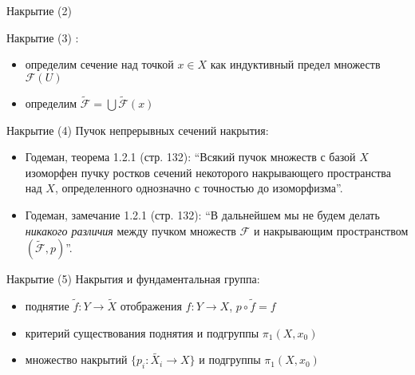 \documentclass{beamer}
\begin{document}
\begin{frame}{Накрытие (2)}
\begin{center}
	\begin{figure}[H]
	\end{figure}
\end{center}
\end{frame}

\begin{frame}{Накрытие (3)}
:\\
\medskip
\begin{itemize}
	\item определим сечение над точкой $x \in X$ как индуктивный предел множеств $\mathcal{F}(U)$
	\item определим $\widetilde{\mathcal{F}} = \bigcup \widetilde{\mathcal{F}}(x)$
\end{itemize}
\end{frame}

\begin{frame}{Накрытие (4)}
Пучок непрерывных сечений накрытия:\\
\medskip
\begin{itemize}
    \item Годеман, теорема 1.2.1 (стр. 132): ``Всякий пучок множеств с базой $X$ изоморфен пучку ростков сечений некоторого накрывающего пространства над $X$, определенного однозначно с точностью до изоморфизма''.
    \smallskip
	\item Годеман, замечание 1.2.1 (стр. 132): ``В дальнейшем мы не будем делать \textit{никакого различия} между пучком множеств $\mathcal{F}$ и накрывающим пространством $(\widetilde{\mathcal{F}}, p)$''.
\end{itemize}
\end{frame}

\begin{frame}{Накрытие (5)}
Накрытия и фундаментальная группа:\\
\medskip
\begin{itemize}
	\item поднятие $\widetilde{f} : Y \to \widetilde{X}$ отображения $f : Y \to X$, $p \circ \widetilde{f} = f$ 
	\item критерий существования поднятия и подгруппы $\pi_1(X, x_0)$
	\item множество накрытий $\{ p_i : \widetilde{X_i} \to X \}$ и подгруппы $\pi_1(X, x_0)$
\end{itemize}
\end{frame}
\end{document}
